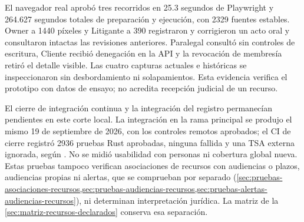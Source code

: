 El navegador real aprobó tres recorridos en 25.3 segundos de Playwright y 264.627 segundos totales de preparación y ejecución, con 2329 fuentes estables. Owner a 1440 píxeles y Litigante a 390 registraron y corrigieron un acto oral y consultaron intactas las revisiones anteriores. Paralegal consultó sin controles de escritura, Cliente recibió denegación en la API y la revocación de membresía retiró el detalle visible. Las cuatro capturas actuales e históricas se inspeccionaron sin desbordamiento ni solapamientos. Esta evidencia verifica el prototipo con datos de ensayo; no acredita recepción judicial de un recurso.

El cierre de integración continua y la integración del registro permanecían pendientes en este corte local. La integración en la rama principal se produjo el mismo 19 de septiembre de 2026, con los controles remotos aprobados; el CI de cierre registró 2936 pruebas Rust aprobadas, ninguna fallida y una TSA externa ignorada, según . No se midió usabilidad con personas ni cobertura global nueva. Estas pruebas tampoco verifican asociaciones de recursos con audiencias o plazos, audiencias propias ni alertas, que se comprueban por separado (\cref{sec:pruebas-asociaciones-recursos,sec:pruebas-audiencias-recursos,sec:pruebas-alertas-audiencias-recursos}), ni determinan interpretación jurídica. La matriz de la \cref{sec:matriz-recursos-declarados} conserva esa separación.
